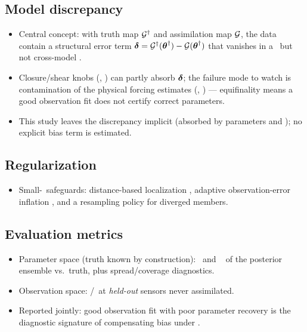 \subsection{Model discrepancy}\label{sec:discrepancy}
\begin{itemize}
  \item Central concept: with truth map $\mathcal{G}^{\dagger}$ and assimilation map
        $\mathcal{G}$, the data contain a structural error term
        $\boldsymbol{\delta} = \mathcal{G}^{\dagger}(\boldsymbol{\theta}^{\dagger}) - \mathcal{G}(\boldsymbol{\theta}^{\dagger})$
        that vanishes in a \twinexp\ but not cross-model
        \cite{kaipio2005statistical,wirgin2004inverse}.
  \item Closure/shear knobs (\shearexp, \sgs) can partly absorb
        $\boldsymbol{\delta}$; the failure mode to watch is contamination of the
        physical forcing estimates (\inflowangle, \velmag) --- equifinality
        means a good observation fit does not certify correct parameters.
  \item This study leaves the discrepancy implicit (absorbed by parameters and
        \Cd); no explicit bias term is estimated.
\end{itemize}

\subsection{Regularization}\label{sec:regularization}
\begin{itemize}
  \item Small-\Ne\ safeguards: distance-based localization
        \cite{gaspari1999construction}, adaptive observation-error inflation
        \cite{houtekamer2001sequential,vossepoel2025inflation}, and a
        resampling policy for diverged members.
\end{itemize}

\subsection{Evaluation metrics}\label{sec:metrics}
\begin{itemize}
  \item Parameter space (truth known by construction): \RMSE\ and \CRPS\
        \cite{gneiting2007strictly} of the posterior ensemble vs.\ truth, plus
        spread/coverage diagnostics.
  \item Observation space: \RMSE/\CRPS\ at \emph{held-out} sensors never
        assimilated.
  \item Reported jointly: good observation fit with poor parameter recovery is
        the diagnostic signature of compensating bias under \discrepancy.
\end{itemize}
